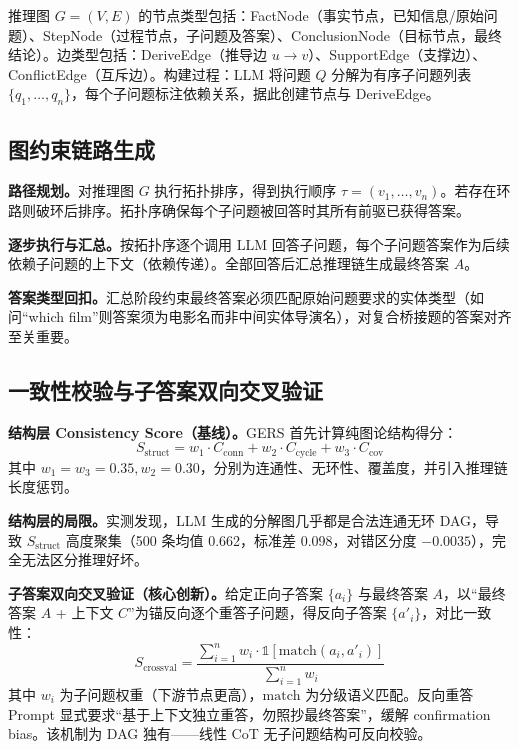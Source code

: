 \documentclass[11pt,a4paper]{ctexart}
\begin{document}
推理图 $G=(V,E)$ 的节点类型包括：FactNode（事实节点，已知信息/原始问题）、StepNode（过程节点，子问题及答案）、ConclusionNode（目标节点，最终结论）。边类型包括：DeriveEdge（推导边 $u \to v$）、SupportEdge（支撑边）、ConflictEdge（互斥边）。构建过程：LLM 将问题 $Q$ 分解为有序子问题列表 $\{q_1, \dots, q_n\}$，每个子问题标注依赖关系，据此创建节点与 DeriveEdge。

\subsection{图约束链路生成}

\textbf{路径规划。}对推理图 $G$ 执行拓扑排序，得到执行顺序 $\tau = (v_1, \dots, v_n)$。若存在环路则破环后排序。拓扑序确保每个子问题被回答时其所有前驱已获得答案。

\textbf{逐步执行与汇总。}按拓扑序逐个调用 LLM 回答子问题，每个子问题答案作为后续依赖子问题的上下文（依赖传递）。全部回答后汇总推理链生成最终答案 $A$。

\textbf{答案类型回扣。}汇总阶段约束最终答案必须匹配原始问题要求的实体类型（如问``which film''则答案须为电影名而非中间实体导演名），对复合桥接题的答案对齐至关重要。

\subsection{一致性校验与子答案双向交叉验证}

\textbf{结构层 Consistency Score（基线）。}GERS 首先计算纯图论结构得分：
\begin{equation}
S_{\text{struct}} = w_1 \cdot C_{\text{conn}} + w_2 \cdot C_{\text{cycle}} + w_3 \cdot C_{\text{cov}}
\end{equation}
其中 $w_1=w_3=0.35, w_2=0.30$，分别为连通性、无环性、覆盖度，并引入推理链长度惩罚。

\textbf{结构层的局限。}实测发现，LLM 生成的分解图几乎都是合法连通无环 DAG，导致 $S_{\text{struct}}$ 高度聚集（500 条均值 0.662，标准差 0.098，对错区分度 $-0.0035$），完全无法区分推理好坏。

\textbf{子答案双向交叉验证（核心创新）。}给定正向子答案 $\{a_i\}$ 与最终答案 $A$，以``最终答案 $A$ + 上下文 $C$''为锚反向逐个重答子问题，得反向子答案 $\{a'_i\}$，对比一致性：
\begin{equation}
S_{\text{crossval}} = \frac{\sum_{i=1}^{n} w_i \cdot \mathbb{1}[\text{match}(a_i, a'_i)]}{\sum_{i=1}^{n} w_i}
\end{equation}
其中 $w_i$ 为子问题权重（下游节点更高），$\text{match}$ 为分级语义匹配。反向重答 Prompt 显式要求``基于上下文独立重答，勿照抄最终答案''，缓解 confirmation bias。该机制为 DAG 独有——线性 CoT 无子问题结构可反向校验。
\end{document}
